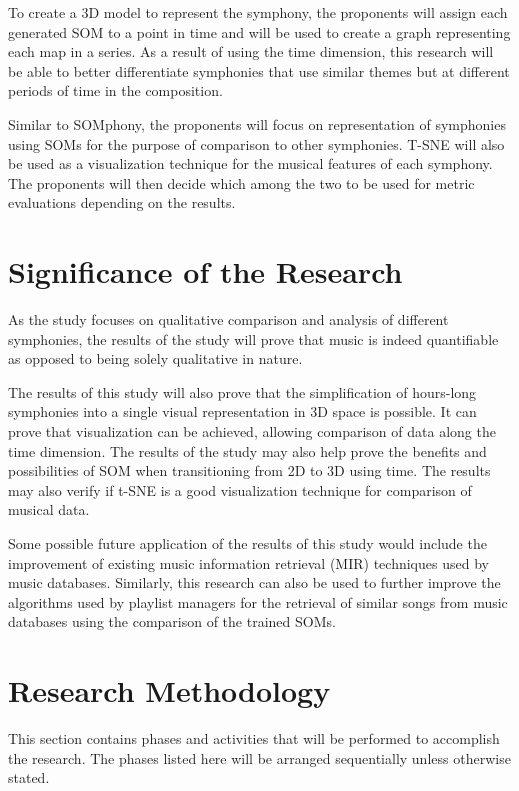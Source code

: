 To create a 3D model to represent the symphony, the proponents will assign each generated SOM to a point in time and will be used to create a graph representing each map in a series. As a result of using the time dimension, this research will be able to better differentiate symphonies that use similar themes but at different periods of time in the composition.

Similar to SOMphony, the proponents will focus on representation of symphonies using SOMs for the purpose of comparison to other symphonies. T-SNE will also be used as a visualization technique for the musical features of each symphony. The proponents will then decide which among the two to be used for metric evaluations depending on the results.

\section{Significance of the Research}
\label{sec:significance}
As the study focuses on qualitative comparison and analysis of different symphonies, the results of the study will prove that music is indeed quantifiable as opposed to being solely qualitative in nature. 

The results of this study will also prove that the simplification of hours-long symphonies into a single visual representation in 3D space is possible.  It can prove that visualization can be achieved, allowing comparison of data along the time dimension. The results of the study may also help prove the benefits and possibilities of SOM when transitioning from 2D to 3D using time. The results may also verify if t-SNE is a good visualization technique for comparison of musical data.

Some possible future application of the results of this study would include the improvement of existing music information retrieval (MIR) techniques used by music databases. Similarly, this research can also be used to further improve the algorithms used by playlist managers for the retrieval of similar songs from music databases using the comparison of the trained SOMs.

\section{Research Methodology}
\label{sec:researchmethod}
This section contains phases and activities that will be performed to accomplish the research. The phases listed here will be arranged sequentially unless otherwise stated.

